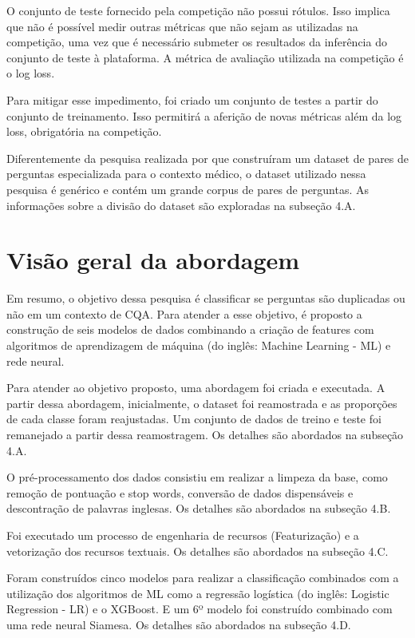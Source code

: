 \documentclass[conference]{IEEEtran}
\begin{document}
O conjunto de teste fornecido pela competição não possui rótulos. Isso implica que não é possível medir outras métricas que não sejam as utilizadas na competição, uma vez que é necessário submeter os resultados da inferência do conjunto de teste à plataforma. A métrica de avaliação utilizada na competição é o log loss.

Para mitigar esse impedimento, foi criado um conjunto de testes a partir do conjunto de treinamento. Isso permitirá a aferição de novas métricas além da log loss, obrigatória na competição.

Diferentemente da pesquisa realizada por \cite{McCreery2020} que construíram um dataset de pares de perguntas especializada para o contexto médico, o dataset utilizado nessa pesquisa é genérico e contém um grande corpus de pares de perguntas. As informações sobre a divisão do dataset são exploradas na subseção 4.A.

\section{Visão geral da abordagem}

Em resumo, o objetivo dessa pesquisa é classificar se perguntas são duplicadas ou não em um contexto de CQA. Para atender a esse objetivo, é proposto a construção de seis modelos de dados combinando a criação de features com algoritmos de aprendizagem de máquina (do inglês: Machine Learning - ML) e rede neural.

Para atender ao objetivo proposto, uma abordagem foi criada e executada. A partir dessa abordagem, inicialmente, o dataset foi reamostrada e as proporções de cada classe foram reajustadas. Um conjunto de dados de treino e teste foi remanejado a partir dessa reamostragem. Os detalhes são abordados na subseção 4.A.

O pré-processamento dos dados consistiu em realizar a limpeza da base, como remoção de pontuação e stop words, conversão de dados dispensáveis e descontração de palavras inglesas. Os detalhes são abordados na subseção 4.B.

Foi executado um processo de engenharia de recursos (Featurização) e a vetorização dos recursos textuais. Os detalhes são abordados na subseção 4.C.

Foram construídos cinco modelos para realizar a classificação combinados com a utilização dos algoritmos de ML como a regressão logística (do inglês: Logistic Regression - LR) e o XGBoost. E um 6º modelo foi construído combinado com uma rede neural Siamesa. Os detalhes são abordados na subseção 4.D.
\end{document}
